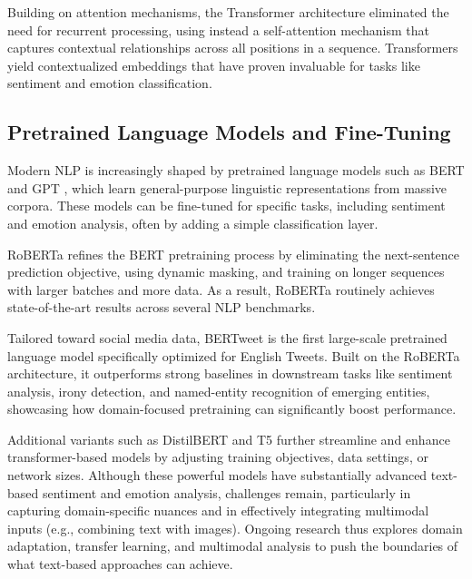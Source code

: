 Building on attention mechanisms, the Transformer architecture \cite{vaswani2023attentionneed} eliminated the need for recurrent processing, using instead a self-attention mechanism that captures contextual relationships across all positions in a sequence. Transformers yield contextualized embeddings that have proven invaluable for tasks like sentiment and emotion classification.

\subsection*{Pretrained Language Models and Fine-Tuning}
Modern NLP is increasingly shaped by pretrained language models such as BERT \cite{DBLP:journals/corr/abs-1810-04805} and GPT \cite{Radford2018ImprovingLU}, which learn general-purpose linguistic representations from massive corpora. These models can be fine-tuned for specific tasks, including sentiment and emotion analysis, often by adding a simple classification layer.
\newline

RoBERTa \cite{DBLP:journals/corr/abs-1907-11692} refines the BERT pretraining process by eliminating the next-sentence prediction objective, using dynamic masking, and training on longer sequences with larger batches and more data. As a result, RoBERTa routinely achieves state-of-the-art results across several NLP benchmarks.
\newline

Tailored toward social media data, BERTweet \cite{nguyen-etal-2020-bertweet} is the first large-scale pretrained language model specifically optimized for English Tweets. Built on the RoBERTa architecture, it outperforms strong baselines in downstream tasks like sentiment analysis, irony detection, and named-entity recognition of emerging entities, showcasing how domain-focused pretraining can significantly boost performance.
\newline

Additional variants such as DistilBERT \cite{sanh2020distilbertdistilledversionbert} and T5 \cite{raffel2023exploringlimitstransferlearning} further streamline and enhance transformer-based models by adjusting training objectives, data settings, or network sizes. Although these powerful models have substantially advanced text-based sentiment and emotion analysis, challenges remain, particularly in capturing domain-specific nuances and in effectively integrating multimodal inputs (e.g., combining text with images). Ongoing research thus explores domain adaptation, transfer learning, and multimodal analysis to push the boundaries of what text-based approaches can achieve.

